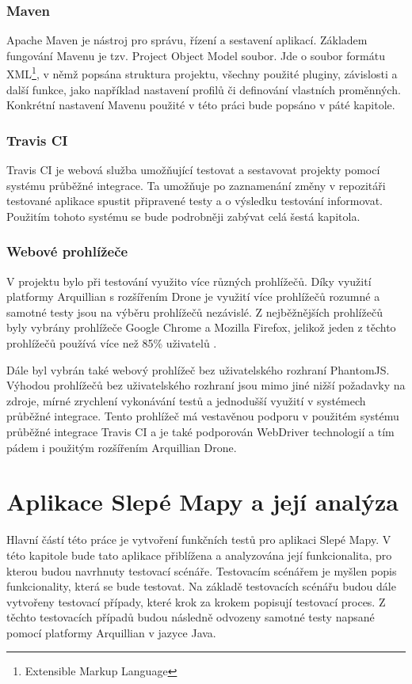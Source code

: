 \documentclass[
    color,   %
	table,   %
    twoside, %
]{fithesis3}
\begin{document}
\subsection{Maven}
Apache Maven \cite{Maven} je nástroj pro správu, řízení a sestavení aplikací. Základem fungování Mavenu je tzv. Project Object Model soubor. Jde o soubor formátu XML\footnote{Extensible Markup Language}, v němž popsána struktura projektu, všechny použité pluginy, závislosti a další funkce, jako například nastavení profilů či definování vlastních proměnných. Konkrétní nastavení Mavenu použité v této práci bude popsáno v páté kapitole.
\subsection{Travis CI}
Travis CI je webová služba umožňující testovat a sestavovat projekty pomocí systému průběžné integrace. Ta umožňuje po zaznamenání změny v repozitáři testované aplikace spustit připravené testy a o výsledku testování informovat. Použitím tohoto systému se bude podrobněji zabývat celá šestá kapitola.
\subsection{Webové prohlížeče}
V projektu bylo při testování využito více různých prohlížečů. Díky využití platformy Arquillian s rozšířením Drone je využití více prohlížečů rozumné a samotné testy jsou na výběru prohlížečů nezávislé. Z nejběžnějších prohlížečů byly vybrány prohlížeče Google Chrome a Mozilla Firefox, jelikož jeden z těchto prohlížečů používá více než 85\% uživatelů \cite{Browsers}.

Dále byl vybrán také webový prohlížeč bez uživatelského rozhraní PhantomJS. Výhodou prohlížečů bez uživatelského rozhraní jsou mimo jiné nižší požadavky na zdroje, mírné zrychlení vykonávání testů a jednodušší využití v systémech průběžné integrace. Tento prohlížeč má vestavěnou podporu v použitém systému průběžné integrace Travis CI a je také podporován WebDriver technologií a tím pádem i použitým rozšířením Arquillian Drone.

\chapter{Aplikace Slepé Mapy a její analýza}
Hlavní částí této práce je vytvoření funkčních testů pro aplikaci Slepé Mapy. V této kapitole bude tato aplikace přiblížena a analyzována její funkcionalita, pro kterou  budou navrhnuty testovací scénáře. Testovacím scénářem je myšlen popis funkcionality, která se bude testovat. Na základě testovacích scénářu budou dále vytvořeny testovací případy, které krok za krokem popisují testovací proces. Z těchto testovacích případů budou následně odvozeny samotné testy napsané pomocí platformy Arquillian v jazyce Java.
\end{document}
